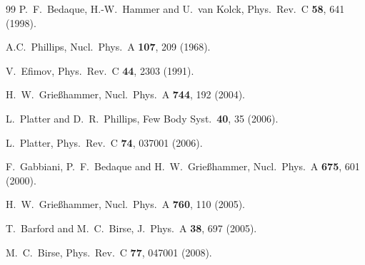 \documentclass[aps,rmp,nofootinbib,twocolumn,floatfix]{revtex4}
\begin{document}
\begin{thebibliography}{99}
  P.~F.~Bedaque, H.-W.~Hammer and U.~van Kolck,
  Phys.\ Rev.\  C {\bf 58}, 641 (1998).


A.C.~Phillips, 
 Nucl.\ Phys.\ A {\bf 107}, 209 (1968).


V.~Efimov, 
Phys.\ Rev.\ C {\bf 44}, 2303 (1991).


  H.~W.~Grie{\ss}hammer,
  Nucl.\ Phys.\  A {\bf 744}, 192 (2004).

  L.~Platter and D.~R.~Phillips,
  Few Body Syst.\  {\bf 40}, 35 (2006).

  L.~Platter,
  Phys.\ Rev.\  C {\bf 74}, 037001 (2006).


  F.~Gabbiani, P.~F.~Bedaque and H.~W.~Grie{\ss}hammer,
  Nucl.\ Phys.\  A {\bf 675}, 601 (2000).

  H.~W.~Grie{\ss}hammer,
  Nucl.\ Phys.\  A {\bf 760}, 110 (2005).


  T.~Barford and M.~C.~Birse,
  J.\ Phys.\ A  {\bf 38}, 697 (2005).

  M.~C.~Birse,
  Phys.\ Rev.\  C {\bf 77}, 047001 (2008).


\end{thebibliography}
\end{document}
